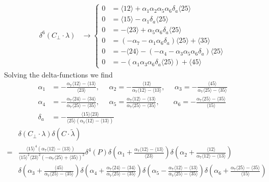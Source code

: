 \documentclass[letter,11pt]{article}
\newcommand{\ab}[1]{\langle #1 \rangle}
\begin{document}
\begin{equation}
	\begin{aligned}
				\delta^{6}(C_\perp\cdot \lambda)&\rightarrow\begin{cases} 0&=
		\langle 1 2 \rangle + \alpha_{1} \alpha_{2} \alpha_{5} \alpha_{6} \delta_a \langle 2 5 \rangle
		\\0&=
		\langle 1 5 \rangle - \alpha_{1} \delta_a \langle 2 5 \rangle
		\\0&=
		-\langle 2 3 \rangle + \alpha_{5} \alpha_{6} \delta_a \langle 2 5 \rangle
		\\0&=
		(-\alpha_{7} - \alpha_{1} \alpha_{6} \delta_a) \langle 2 5 \rangle + \langle 3 5 \rangle
		\\0&=
		-\langle 2 4 \rangle - (-\alpha_{4} - \alpha_{3} \alpha_{5} \alpha_{6} \delta_a) \langle 2 5 \rangle
		\\0&=
		-(\alpha_{1} \alpha_{3} \alpha_{6} \delta_a \langle 2 5 \rangle) + \langle 4 5 \rangle
				\end{cases}
	\end{aligned}
\end{equation}
Solving the delta-functions we find
\begin{equation}
	\begin{aligned}
		\alpha_1&=-\frac{
			\alpha_7\ab{12}-\ab{13}
		}{	\ab{23}},~~~~~~
		\alpha_2=-\frac{\ab{12}}{\alpha_7\ab{12}-\ab{13}},~~~~~~
		\alpha_3=-\frac{\ab{45}}{\alpha_7\ab{25}-\ab{35}}\\
		\alpha_4&=-\frac{\alpha_7\ab{24}-\ab{34}}{\alpha_7\ab{25}-\ab{35}}
		,~~~~~~
		\alpha_5=\frac{\alpha_7\ab{12}-\ab{13}}{\alpha_7\ab{25}-\ab{35}}
		,~~~~~~~~\,
		\alpha_6=-\frac{\alpha_7\ab{25}-\ab{35}}{\ab{15}}
		\\
		\delta_a&=-\frac{\ab{15}\ab{23}}{\ab{25}\left(\alpha_7\ab{12}-\ab{13}\right)}
	\end{aligned}
\end{equation}
\begin{equation}
	\begin{aligned}
		&\delta(C_\perp\cdot \lambda)\delta(C\cdot \tilde \lambda)\\
		=&
		\frac{\ab{15}^4\left(\alpha_7\ab{12}-\ab{13}\right)^{\phantom{2}}}{\ab{15}^2\ab{23}^2 \left(-\alpha_7\ab{25}+\ab{35}\right)^2}\delta^4( P)
		\delta\left(\alpha_1+\frac{
			\alpha_7\ab{12}-\ab{13}
		}{	\ab{23}}\right)
		\delta\left(\alpha_2+\frac{\ab{12}}{\alpha_7\ab{12}-\ab{13}}\right)\\&
		\delta\left(\alpha_3+\frac{\ab{45}}{\alpha_7\ab{25}-\ab{35}}\right)
		\delta\left(\alpha_4+\frac{\alpha_7\ab{24}-\ab{34}}{\alpha_7\ab{25}-\ab{35}}\right)
		\delta\left(\alpha_5-\frac{\alpha_7\ab{12}-\ab{13}}{\alpha_7\ab{25}-\ab{35}}\right)
		\delta\left(\alpha_6+\frac{\alpha_7\ab{25}-\ab{35}}{\ab{15}}\right)
	\end{aligned}
\end{equation}
\end{document}
